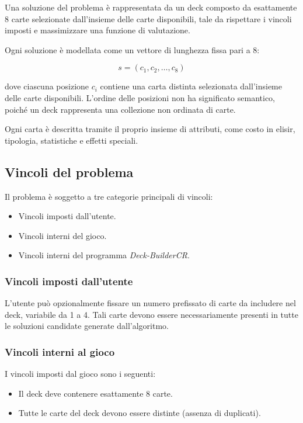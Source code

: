 \documentclass{article}
\begin{document}
Una soluzione del problema è rappresentata da un deck composto da esattamente 8 carte selezionate dall’insieme delle carte disponibili, tale da rispettare i vincoli imposti e massimizzare una funzione di valutazione.

Ogni soluzione è modellata come un vettore di lunghezza fissa pari a 8:

\[
s = (c_1, c_2, \dots, c_8)
\]

dove ciascuna posizione $c_i$ contiene una carta distinta selezionata dall’insieme delle carte disponibili. 
L’ordine delle posizioni non ha significato semantico, poiché un deck rappresenta una collezione non ordinata di carte.

Ogni carta è descritta tramite il proprio insieme di attributi, come costo in elisir, tipologia, statistiche e effetti speciali.

\subsection{Vincoli del problema}

Il problema è soggetto a tre categorie principali di vincoli:
\begin{itemize}
    \item Vincoli imposti dall’utente.
    \item Vincoli interni del gioco.
    \item Vincoli interni del programma \textit{Deck-BuilderCR}.
\end{itemize}

\subsubsection{Vincoli imposti dall’utente}

L’utente può opzionalmente fissare un numero prefissato di carte da includere nel deck, variabile da 1 a 4. 
Tali carte devono essere necessariamente presenti in tutte le soluzioni candidate generate dall’algoritmo.

\subsubsection{Vincoli interni al gioco}

I vincoli imposti dal gioco sono i seguenti:
\begin{itemize}
    \item Il deck deve contenere esattamente 8 carte.
    \item Tutte le carte del deck devono essere distinte (assenza di duplicati).
\end{itemize}
\end{document}
